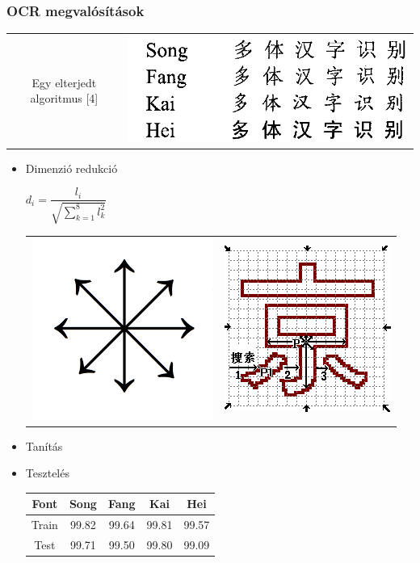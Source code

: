 \documentclass{beamer}
\begin{document}
\begin{frame}[fragile]
\frametitle{OCR megvalósítások}
\begin{tabular}{c c}
{\large Egy elterjedt algoritmus [4]} & 
\includegraphics[scale=0.2, center]{chinese_fonts1}
\end{tabular}
\begin{itemize}
\item Dimenzió redukció

\(d_i = \dfrac{l_i}{\sqrt{\displaystyle \sum_{k=1}^8 l_k^2}}\)
\begin{tabular}{ c c }
\includegraphics[scale=0.3]{8direction} & \includegraphics[scale=0.3]{ocr_PDC}
\end{tabular}
\item Tanítás
\item Tesztelés 
\begin{table}
\centering
\begin{tabular}{ |c|c|c|c|c|}
\hline
Font & Song & Fang & Kai & Hei\\
\hline
Train & 99.82 & 99.64 & 99.81 & 99.57\\
\hline
Test & 99.71 & 99.50 & 99.80 & 99.09\\
\hline
\end{tabular}
\end{table}
\end{itemize}
\end{frame}
\end{document}
